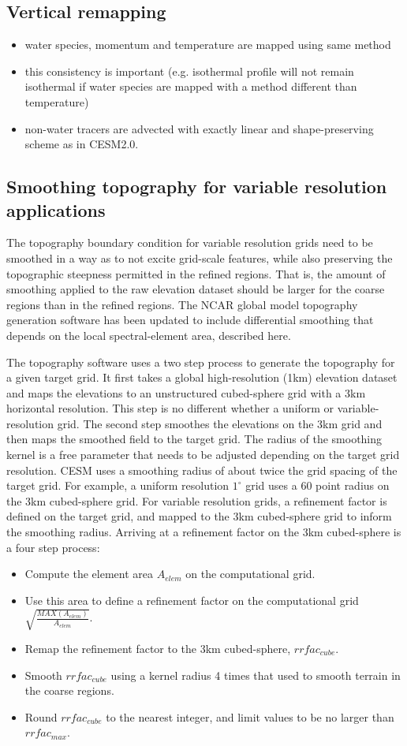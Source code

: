 \documentclass[draft]{agujournal2019}
\begin{document}
\subsection{Vertical remapping}
\begin{itemize}
\item water species, momentum and temperature are mapped using same method
\item this consistency is important (e.g. isothermal profile will not remain isothermal if water species are mapped with a method different than temperature)
\item non-water tracers are advected with exactly linear and shape-preserving scheme as in CESM2.0.
\end{itemize}
\subsection{Smoothing topography for variable resolution applications}
The topography boundary condition for variable resolution grids need to be smoothed in a way as to not excite grid-scale features, while also preserving the topographic steepness permitted in the refined regions. That is, the amount of smoothing applied to the raw elevation dataset should be larger for the coarse regions than in the refined regions. The NCAR global model topography generation software \cite{LetAl2015GMD} has been updated to include differential smoothing that depends on the local spectral-element area, described here. 

The topography software uses a two step process to generate the topography for a given target grid. It first takes a global high-resolution (1km) elevation dataset and maps the elevations to an unstructured cubed-sphere grid with a 3km horizontal resolution. This step is no different whether a uniform or variable-resolution grid. The second step smoothes the elevations on the 3km grid and then maps the smoothed field to the target grid. The radius of the smoothing kernel is a free parameter that needs to be adjusted depending on the target grid resolution. CESM uses a smoothing radius of about twice the grid spacing of the target grid. For example, a uniform resolution $1^{\circ}$ grid uses a 60 point radius on the 3km cubed-sphere grid. For variable resolution grids, a refinement factor is defined on the target grid, and mapped to the 3km cubed-sphere grid to inform the smoothing radius. Arriving at a refinement factor on the 3km cubed-sphere is a four step process:
\begin{itemize}
\item Compute the element area $A_{elem}$ on the computational grid.
\item Use this area to define a refinement factor on the computational grid $\sqrt{\frac{MAX(A_{elem})}{A_{elem}}}$.
\item Remap the refinement factor to the 3km cubed-sphere, $rrfac_{cube}$.
\item Smooth $rrfac_{cube}$ using a kernel radius 4 times that used to smooth terrain in the coarse regions.
\item Round $rrfac_{cube}$ to the nearest integer, and limit values to be no larger than $rrfac_{max}$.
\end{itemize}
\end{document}
